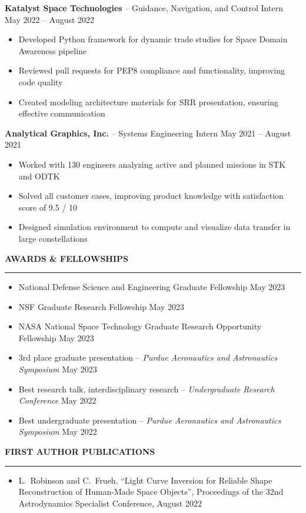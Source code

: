 \documentclass[11pt, a4paper]{article}
\newcommand{\sectiontitle}[1]{{\Large \textbf{#1}}\vspace{0.5em}\hrule\vspace{0.5em}}
\begin{document}
\textbf{Katalyst Space Technologies} -- Guidance, Navigation, and Control Intern \hfill May 2022 -- August 2022
\begin{itemize}[noitemsep]
    \item Developed Python framework for dynamic trade studies for Space Domain Awareness pipeline
    \item Reviewed pull requests for PEP8 compliance and functionality, improving code quality
    \item Created modeling architecture materials for SRR presentation, ensuring effective communication
\end{itemize}

\textbf{Analytical Graphics, Inc.} -- Systems Engineering Intern \hfill May 2021 -- August 2021
\begin{itemize}[noitemsep]
    \item Worked with 130 engineers analyzing active and planned missions in STK and ODTK
    \item Solved all customer cases, improving product knowledge with satisfaction score of 9.5 / 10
    \item Designed simulation environment to compute and visualize data transfer in large constellations
\end{itemize}

\sectiontitle{AWARDS \& FELLOWSHIPS}
\begin{itemize}[noitemsep]
    \item National Defense Science and Engineering Graduate Fellowship \hfill May 2023
    \item NSF Graduate Research Fellowship \hfill May 2023
    \item NASA National Space Technology Graduate Research Opportunity Fellowship \hfill May 2023
    \item 3rd place graduate presentation -- \textit{Purdue Aeronautics and Astronautics Symposium} \hfill May 2023
    \item Best research talk, interdisciplinary research -- \textit{Undergraduate Research Conference} \hfill May 2022
    \item Best undergraduate presentation -- \textit{Purdue Aeronautics and Astronautics Symposium} \hfill May 2022
\end{itemize}

\sectiontitle{FIRST AUTHOR PUBLICATIONS}
\begin{itemize}[noitemsep]
    \item L.\ Robinson and C.\ Frueh, “Light Curve Inversion for Reliable Shape Reconstruction of Human-Made
    Space Objects”, Proceedings of the 32nd Astrodynamics Specialist Conference, August 2022
\end{itemize}
\end{document}
